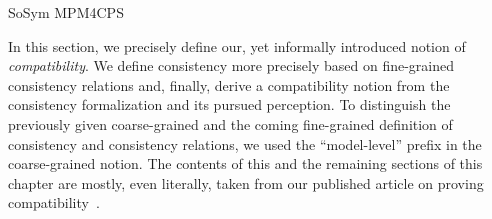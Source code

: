 \begin{copiedFrom}{SoSym MPM4CPS}

In this section, we precisely define our, yet informally introduced notion of \emph{compatibility}.
We define consistency more precisely based on fine-grained consistency relations and,
finally, derive a compatibility notion from the consistency formalization and its pursued perception.
To distinguish the previously given coarse-grained and the coming fine-grained definition of consistency and consistency relations, we used the \enquote{model-level} prefix in the coarse-grained notion.
The contents of this and the remaining sections of this chapter are mostly, even literally, taken from our published article on proving compatibility~.





\end{copiedFrom}
